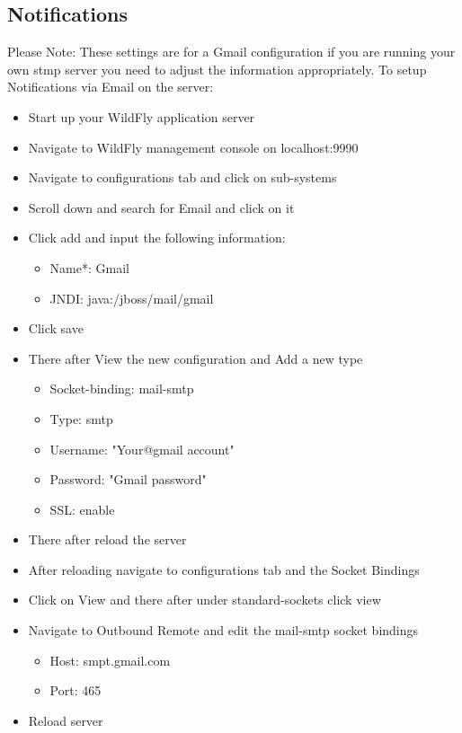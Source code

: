 \documentclass[11pt,a4paper]{article}
\begin{document}
\subsection{Notifications}
Please Note: These settings are for a Gmail configuration if you are running your own stmp server you need to adjust the information appropriately. 
To setup Notifications via Email on the server: \\
\begin{itemize}
	\item Start up your WildFly application server
	\item Navigate to WildFly management console on localhost:9990
	\item Navigate to configurations tab and click on sub-systems
	\item Scroll down and search for Email and click on it
	\item Click add and input the following information:
	\begin{itemize}
		\item Name*: Gmail 
		\item JNDI: java:/jboss/mail/gmail
	\end{itemize}
	\item Click save \\
	\item There after View the new configuration and Add a new type
	\begin{itemize}
		\item Socket-binding: mail-smtp
		\item Type: smtp
		\item Username: "Your@gmail account"
		\item Password: "Gmail password"
		\item SSL: enable
	\end{itemize}
	\item There after reload the server
	\item After reloading navigate to configurations tab and the Socket Bindings
	\item Click on View and there after under standard-sockets click view
	\item Navigate to Outbound Remote and edit the mail-smtp socket bindings
		\begin{itemize}
		\item Host: smpt.gmail.com
		\item Port: 465
	\end{itemize}
	\item Reload server
\end{itemize}
\end{document}
